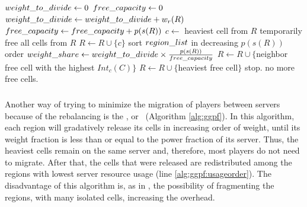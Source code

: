 \begin{algorithm}
\caption{\ggpk}
\label{alg:ggpk}
\begin{algorithmic}[1]
	 \STATE $weight\_to\_divide \leftarrow 0$
	 \STATE $free\_capacity \leftarrow 0$
	 		\STATE $weight\_to\_divide \leftarrow weight\_to\_divide + w_r(R)$
	 		\STATE $free\_capacity \leftarrow free\_capacity + p(s(R))$
	 		\STATE $c \leftarrow $ heaviest cell from $R$ \label{alg:ggpk:saveheaviestcell}
	 		\STATE temporarily free all cells from $R$
	 		\STATE $R \leftarrow R \cup \{c\}$ \label{alg:ggpk:getbackheaviestcell}
	 \ENDFOR
	 \STATE sort $region\_list$ in decreasing $p(s(R))$ order
	 		\STATE $weight\_share \leftarrow weight\_to\_divide \times \frac{p(s(R))}{free\_capacity}$
	 		 \label{alg:ggpk:whilefraction}
	 		   		\STATE $R \leftarrow R \cup \{$neighbor free cell with the highest $Int_c(C)$$\}$
	 		   		\STATE $R \leftarrow R \cup \{$heaviest free cell$\}$ \label{alg:ggpk:freeheavycell}
	 		   \ELSE
	 		   		\STATE stop. no more free cells.
	 		   \ENDIF
	 		\ENDWHILE
	 \ENDFOR
\end{algorithmic}
\end{algorithm}

\subsubsection{\ggpf} %
Another way of trying to minimize the migration of players between servers because of the rebalancing is the \textbf{\ggpf}, or \ggpfmeaning\ (Algorithm \ref{alg:ggpf}). In this algorithm, each region will gradatively release its cells in increasing order of weight, until its weight fraction is less than or equal to the power fraction of its server. Thus, the heaviest cells remain on the same server and, therefore, most players do not need to migrate. After that, the cells that were released are redistributed among the regions with lowest server resource usage (line \ref{alg:ggpf:usageorder}). The disadvantage of this algorithm is, as in \ggpk, the possibility of fragmenting the regions, with many isolated cells, increasing the overhead.

